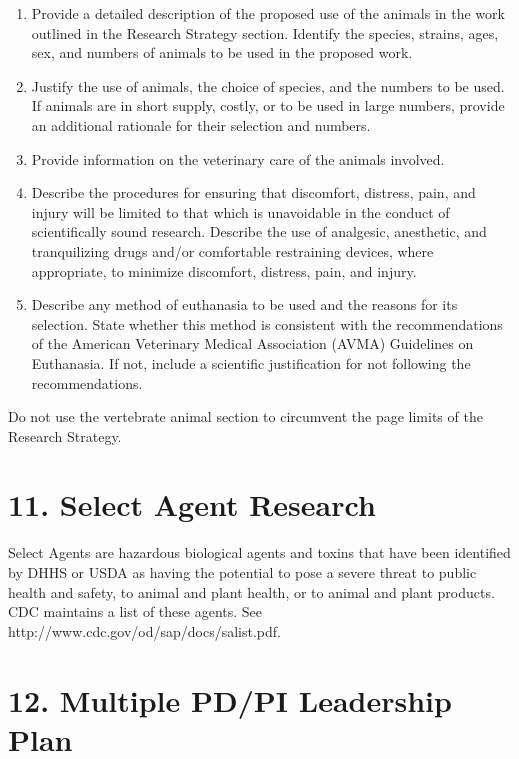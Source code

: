 \documentclass[11pt,notitlepage]{article}
\begin{document}
\begin{enumerate}
\item Provide a detailed description of the proposed use of the animals in the work outlined in the Research Strategy section. Identify the species, strains, ages, sex, and numbers of animals to be used in the proposed work.
\item Justify the use of animals, the choice of species, and the numbers to be used. If animals are in short supply, costly, or to be used in large numbers, provide an additional rationale for their selection and numbers.
\item Provide information on the veterinary care of the animals involved.
\item Describe the procedures for ensuring that discomfort, distress, pain, and injury will be limited to that which is unavoidable in the conduct of scientifically sound research. Describe the use of analgesic, anesthetic, and tranquilizing drugs and/or comfortable restraining devices, where appropriate, to minimize discomfort, distress, pain, and injury.
\item Describe any method of euthanasia to be used and the reasons for its selection. State whether this method is consistent with the recommendations of the American Veterinary Medical Association (AVMA) Guidelines on Euthanasia. If not, include a scientific justification for not following the recommendations.
\end{enumerate}

Do not use the vertebrate animal section to circumvent the page limits of the Research Strategy.


\newpage

\section*{11. Select Agent Research}

Select Agents are hazardous biological agents and toxins that have been identified by DHHS or USDA as having the potential to pose a severe threat to public health and safety, to animal and plant health, or to animal and plant products. CDC maintains a list of these agents. See http://www.cdc.gov/od/sap/docs/salist.pdf.


\newpage

\section*{12. Multiple PD/PI Leadership Plan}
\end{document}
